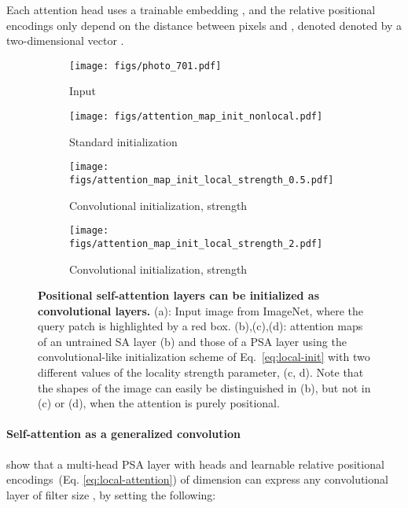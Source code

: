 Each attention head uses a trainable embedding , and the relative positional encodings  only depend on the distance between pixels  and ,  denoted denoted by a two-dimensional vector . 

\begin{figure}[tb]
    \centering
    \hspace{-1.5em}
    \begin{subfigure}[b]{.32\columnwidth}
    \texttt{[image: figs/photo\_701.pdf]}
    \caption{Input}
    \end{subfigure}
    \hspace{-1.1em}
    \begin{subfigure}[b]{.74\columnwidth}
    \texttt{[image: figs/attention\_map\_init\_nonlocal.pdf]}
    \caption{Standard initialization}
    \end{subfigure}
    \begin{subfigure}[b]{\columnwidth}
    \texttt{[image: figs/attention\_map\_init\_local\_strength\_0.5.pdf]}
    \caption{Convolutional initialization, strength }
    \end{subfigure}   
    \begin{subfigure}[b]{\columnwidth}
    \texttt{[image: figs/attention\_map\_init\_local\_strength\_2.pdf]}
    \caption{Convolutional initialization, strength }
    \end{subfigure}
    \caption{\textbf{Positional self-attention layers can be initialized as convolutional layers.} (a): Input image from ImageNet, where the query patch is highlighted by a red box. (b),(c),(d): attention maps of an untrained SA layer (b) and those of a PSA layer using the convolutional-like initialization scheme of Eq.~\ref{eq:local-init} with two different values of the locality strength parameter,  (c, d). Note that the shapes of the image can easily be distinguished in (b), but not in (c) or (d), when the attention is purely positional.}
    \label{fig:maps-init}
\end{figure}

\paragraph{Self-attention as a generalized convolution}

\citet{cordonnier2019relationship} show that a multi-head PSA layer with  heads and learnable relative positional encodings~(Eq. \ref{eq:local-attention}) of dimension  can express any convolutional layer of filter size , by setting the following:


